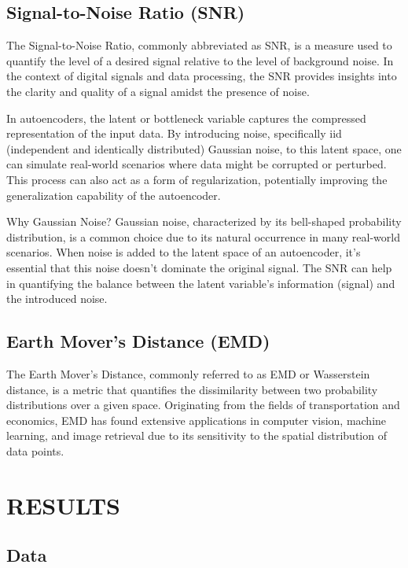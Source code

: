 \documentclass{article}
\begin{document}
\subsection{Signal-to-Noise Ratio (SNR)}
\label{ssec:snr}

The Signal-to-Noise Ratio, commonly abbreviated as SNR, is a measure used to quantify the level of a desired signal relative to the level of background noise. 
In the context of digital signals and data processing, the SNR \cite{vincent2008extracting} provides insights into the clarity and quality of a signal amidst the presence of noise.

In autoencoders, the latent or bottleneck variable captures the compressed representation of the input data. By introducing noise, specifically iid (independent and identically distributed) Gaussian noise, to this latent space, one can simulate real-world scenarios where data might be corrupted or perturbed. This process can also act as a form of regularization, potentially improving the generalization capability of the autoencoder.

Why Gaussian Noise? 
Gaussian noise, characterized by its bell-shaped probability distribution, is a common choice due to its natural occurrence in many real-world scenarios. When noise is added to the latent space of an autoencoder, it's essential that this noise doesn't dominate the original signal. The SNR can help in quantifying the balance between the latent variable's information (signal) and the introduced noise.

\subsection{Earth Mover's Distance (EMD)}
\label{ssec:emd}

The Earth Mover's Distance, commonly referred to as EMD or Wasserstein distance\cite{tolstikhin2017wasserstein}, is a metric that quantifies the dissimilarity between two probability distributions over a given space. Originating from the fields of transportation and economics, EMD has found extensive applications in computer vision, machine learning, and image retrieval due to its sensitivity to the spatial distribution of data points.

\section{RESULTS}
\label{sec:results}

\subsection{Data}
\label{ssec:data}
\end{document}
